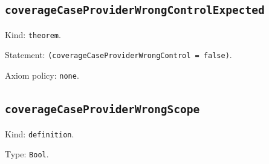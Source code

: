 \documentclass[11pt]{article}
\begin{document}
\subsection*{\texttt{coverageCaseProviderWrongControlExpected}}
\noindent Kind: \texttt{theorem}.\par
\noindent Statement: \texttt{(coverageCaseProviderWrongControl = false)}.\par
\noindent Axiom policy: \texttt{none}.\par
\subsection*{\texttt{coverageCaseProviderWrongScope}}
\noindent Kind: \texttt{definition}.\par
\noindent Type: \texttt{Bool}.\par
\end{document}
